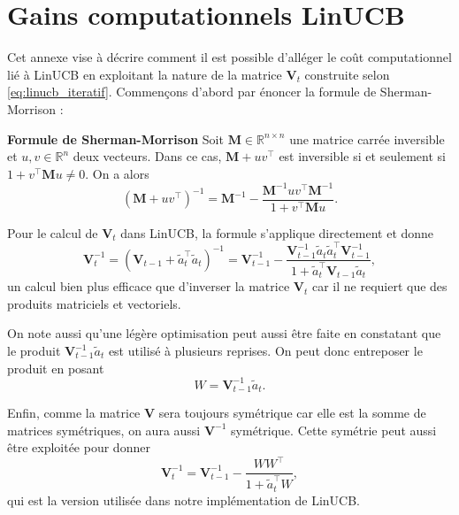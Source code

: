 \chapter{Gains computationnels LinUCB}     %
\label{chap:lincub_gains}                   %

Cet annexe vise à décrire comment il est possible d'alléger le coût computationnel
lié à LinUCB en exploitant la nature de la matrice $\mathbf{V}_t$ construite
selon \eqref{eq:linucb_iteratif}.
Commençons d'abord par énoncer la formule de Sherman-Morrison \citep{sherman1950adjustment}:

\textbf{Formule de Sherman-Morrison}
Soit $\mathbf{M} \in \mathbb{R}^{n \times n}$ une matrice carrée inversible et $u, v \in \mathbb{R}^n$
deux vecteurs.
Dans ce cas, $\mathbf{M} + uv^\top$ est inversible si et seulement si $1 + v^\top \mathbf{M}u \neq 0$.
On a alors
\begin{equation*}
    \left(\mathbf{M} + uv^\top \right)^{-1} = \mathbf{M}^{-1} - \frac{\mathbf{M}^{-1}uv^\top\mathbf{M}^{-1}}{1 + v^\top \mathbf{M}u}.
    \label{eq:sherman_morrison}
\end{equation*}

Pour le calcul de $\mathbf{V}_t$ dans LinUCB, la formule s'applique directement et
donne 
\begin{equation*}
\mathbf{V}_t^{-1} =
\left(\mathbf{V}_{t-1} + \tilde{a}_{t}^\top \tilde{a}_{t} \right)^{-1} =
\mathbf{V}_{t-1}^{-1} - \frac{\mathbf{V}_{t-1}^{-1}\tilde{a}_{t}\tilde{a}_{t}^\top\mathbf{V}_{t-1}^{-1}}{1 + \tilde{a}_{t}^\top \mathbf{V}_{t-1}\tilde{a}_{t}},
\end{equation*}
un calcul bien plus efficace que d'inverser la matrice $\mathbf{V}_t$ car il ne requiert 
que des produits matriciels et vectoriels.

On note aussi qu'une légère optimisation peut aussi être faite en constatant que 
le produit $\mathbf{V}^{-1}_{t-1}\tilde{a}_{t}$ est utilisé à plusieurs reprises.
On peut donc entreposer le produit en posant 
\begin{equation*}
W = \mathbf{V}^{-1}_{t-1}\tilde{a}_{t}.
\end{equation*}

Enfin, comme la matrice $\mathbf{V}$ sera toujours symétrique car elle est la 
somme de matrices symétriques, on aura aussi $\mathbf{V}^{-1}$ symétrique.
Cette symétrie peut aussi être exploitée pour donner 
\begin{equation*}
    \mathbf{V}_t^{-1} =
    \mathbf{V}_{t-1}^{-1} - \frac{WW^\top}{1 + \tilde{a}_{t}^\top W},
\end{equation*}
qui est la version utilisée dans notre implémentation de LinUCB.